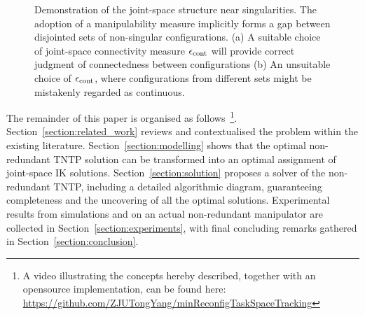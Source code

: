\documentclass[letterpaper, 10 pt, journal, twoside]{ieeetran}  %
\begin{document}
\begin{figure}[t]
\centering
{}
\caption{Demonstration of the joint-space structure near singularities. The adoption of a manipulability measure implicitly forms a gap between disjointed sets of non-singular configurations. (a) A suitable choice of joint-space connectivity measure $\epsilon_{\rm cont}$ will provide correct judgment of connectedness between configurations (b) An unsuitable choice of $\epsilon_{\rm cont}$, where configurations from different sets might be mistakenly regarded as continuous. }\label{fig:sing}
\vspace{-0.3cm}
\end{figure}



The remainder of this paper is organised as follows~\footnote{A video illustrating the concepts hereby described, together with an opensource implementation, can be found here: \\\url{https://github.com/ZJUTongYang/minReconfigTaskSpaceTracking}}.  
Section~\ref{section:related_work} reviews and contextualised the problem within the existing literature. 
Section~\ref{section:modelling} shows that the optimal non-redundant TNTP solution can be transformed into an optimal assignment of joint-space IK solutions. 
Section~\ref{section:solution} proposes a solver of the non-redundant TNTP, including a detailed algorithmic diagram, guaranteeing completeness and the uncovering of all the optimal solutions. 
Experimental results from simulations and on an actual non-redundant manipulator are collected in Section~\ref{section:experiments}, with final concluding remarks gathered in Section~\ref{section:conclusion}.  
\end{document}
